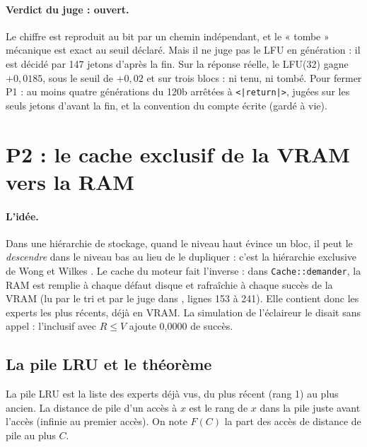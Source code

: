 \paragraph{Verdict du juge : ouvert.} Le chiffre est reproduit au bit par un chemin indépendant, et le « tombe » mécanique est exact au seuil déclaré. Mais il ne juge pas le LFU en génération : il est décidé par 147 jetons d'après la fin. Sur la réponse réelle, le LFU(32) gagne $+0{,}0185$, sous le seuil de $+0{,}02$ et sur trois blocs : ni tenu, ni tombé. Pour fermer P1 : au moins quatre générations du 120b arrêtées à \texttt{<|return|>}, jugées sur les seuls jetons d'avant la fin, et la convention du compte écrite (gardé à vie).

\section{P2 : le cache exclusif de la VRAM vers la RAM}\label{t3mim:sec:p2}

\paragraph{L'idée.} Dans une hiérarchie de stockage, quand le niveau haut évince un bloc, il peut le \emph{descendre} dans le niveau bas au lieu de le dupliquer : c'est la hiérarchie exclusive de Wong et Wilkes \cite{wong2002exclusive}. Le cache du moteur fait l'inverse : dans \texttt{Cache::demander}, la RAM est remplie à chaque défaut disque et rafraîchie à chaque succès de la VRAM (lu par le tri et par le juge dans , lignes 153 à 241). Elle contient donc les experts les plus récents, déjà en VRAM. La simulation de l'éclaireur le disait sans appel : l'inclusif avec $R \le V$ ajoute 0,0000 de succès.

\subsection{La pile LRU et le théorème}\label{t3mim:sec:p2-theoreme}

\begin{definition}\label{t3mim:def:pile}
La pile LRU est la liste des experts déjà vus, du plus récent (rang 1) au plus ancien. La distance de pile d'un accès à $x$ est le rang de $x$ dans la pile juste avant l'accès (infinie au premier accès). On note $F(C)$ la part des accès de distance de pile au plus $C$.
\end{definition}

